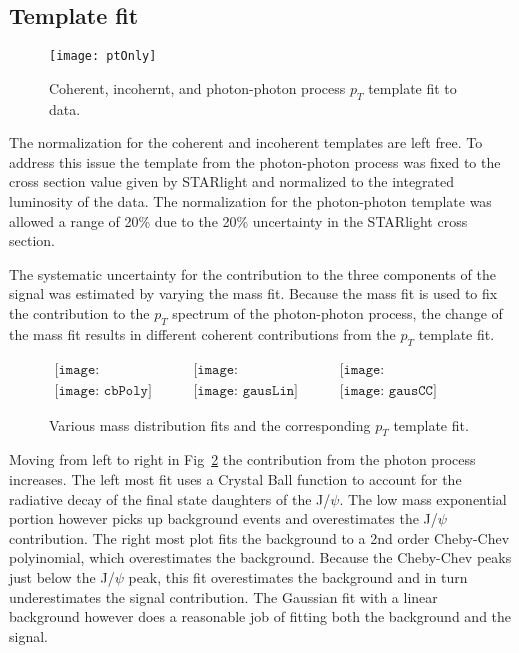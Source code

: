     \subsection{Template fit}
      \begin{figure}[!Hhtb]
        \centering
        \texttt{[image: ptOnly]}
        \caption{Coherent, incohernt, and photon-photon process $p_{T}$ template fit to data.}
        \label{fig:ptTempFit}
      \end{figure}

      The normalization for the coherent and incoherent templates are left
        free. 
      To address this issue the template from the photon-photon process was 
        fixed to the cross section value given by STARlight and normalized to
        the integrated luminosity of the data. 
      The normalization for the photon-photon template was allowed a range of 
        20\% due to the 20\% uncertainty in the STARlight cross section.

      The systematic uncertainty for the contribution to the three components
        of the signal was estimated by varying the mass fit.
      Because the mass fit is used to fix the contribution to the $p_{T}$ 
        spectrum of the photon-photon process, the change of the mass fit
        results in different coherent contributions from the $p_{T}$ template
        fit.

      \begin{figure}[!Hhbt]
        \centering
        $ \begin{array}{ccc}
          \texttt{[image: cbPolyBkgEst]} &
          \texttt{[image: gausLinBkgEst]} &
          \texttt{[image: gausCCBkgEst]} \\
          \texttt{[image: cbPoly]} &
          \texttt{[image: gausLin]} &
          \texttt{[image: gausCC]}
        \end{array} $
        \caption{Various mass distribution fits and the corresponding $p_{T}$
          template fit.}
        \label{fig:massPtFitsForSyst}
      \end{figure}

      Moving from left to right in Fig~\ref{fig:massPtFitsForSyst} the 
        contribution from the photon process increases. 
      The left most fit uses a Crystal Ball function to account for the 
        radiative decay of the final state daughters of the J/$\psi$.
      The low mass exponential portion however picks up background events 
        and overestimates the J/$\psi$ contribution. 
      The right most plot fits the background to a 2nd order Cheby-Chev 
        polyinomial, which overestimates the background.
      Because the Cheby-Chev peaks just below the J/$\psi$ peak, this fit 
        overestimates the background and in turn underestimates the signal 
        contribution.
      The Gaussian fit with a linear background however does a reasonable job
        of fitting both the background and the signal. 

